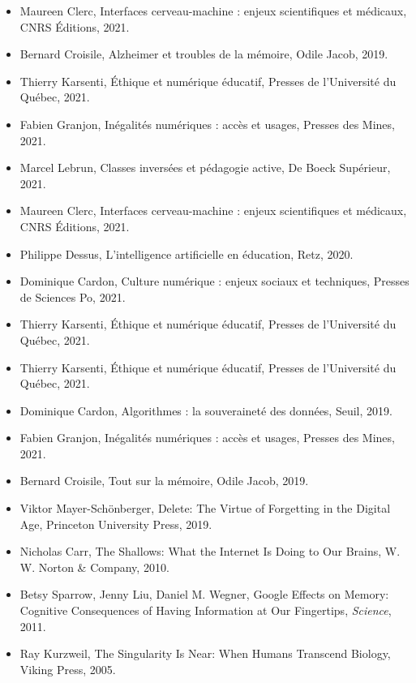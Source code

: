 \documentclass[11pt,a4paper]{report}
\begin{document}
\begin{itemize}
    \item Maureen Clerc, Interfaces cerveau-machine : enjeux scientifiques et médicaux, CNRS Éditions, 2021.
    \item Bernard Croisile, Alzheimer et troubles de la mémoire, Odile Jacob, 2019.
    \item Thierry Karsenti, Éthique et numérique éducatif, Presses de l’Université du Québec, 2021.
    \item Fabien Granjon, Inégalités numériques : accès et usages, Presses des Mines, 2021.
    
    \item Marcel Lebrun, Classes inversées et pédagogie active, De Boeck Supérieur, 2021.
    \item Maureen Clerc, Interfaces cerveau-machine : enjeux scientifiques et médicaux, CNRS Éditions, 2021.
    \item Philippe Dessus, L’intelligence artificielle en éducation, Retz, 2020.
    \item Dominique Cardon, Culture numérique : enjeux sociaux et techniques, Presses de Sciences Po, 2021.
    \item Thierry Karsenti, Éthique et numérique éducatif, Presses de l’Université du Québec, 2021.
    
    \item Thierry Karsenti, Éthique et numérique éducatif, Presses de l’Université du Québec, 2021.
    \item Dominique Cardon, Algorithmes : la souveraineté des données, Seuil, 2019.
    \item Fabien Granjon, Inégalités numériques : accès et usages, Presses des Mines, 2021.
    \item Bernard Croisile, Tout sur la mémoire, Odile Jacob, 2019.
    
    \item Viktor Mayer-Schönberger, Delete: The Virtue of Forgetting in the Digital Age, Princeton University Press, 2019.
    \item Nicholas Carr, The Shallows: What the Internet Is Doing to Our Brains, W. W. Norton \& Company, 2010.
    \item Betsy Sparrow, Jenny Liu, Daniel M. Wegner, Google Effects on Memory: Cognitive Consequences of Having Information at Our Fingertips, \textit{Science}, 2011.
    \item Ray Kurzweil, The Singularity Is Near: When Humans Transcend Biology, Viking Press, 2005.

\end{itemize}
\end{document}
